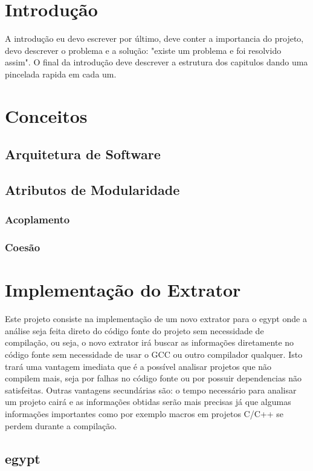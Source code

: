 \chapter{Introdução}

A introdução eu devo escrever por último, deve conter a importancia do projeto,
devo descrever o problema e a solução: "existe um problema e foi resolvido
assim". O final da introdução deve descrever a estrutura dos capitulos dando
uma pincelada rapida em cada um.

\chapter{Conceitos}
\section{Arquitetura de Software}
\section{Atributos de Modularidade}
\subsection{Acoplamento}
\subsection{Coesão}

\chapter{Implementação do Extrator}

Este projeto consiste na implementação de um novo extrator para o egypt onde a
análise seja feita direto do código fonte do projeto sem necessidade de
compilação, ou seja, o novo extrator irá buscar as informações diretamente no
código fonte sem necessidade de usar o GCC ou outro compilador qualquer. Isto
trará uma vantagem imediata que é a possível analisar projetos que
não compilem mais, seja por falhas no código fonte ou por possuir dependencias
não satisfeitas. Outras vantagens secundárias são: o tempo necessário para
analisar um projeto cairá e as informações obtidas serão mais precisas já que
algumas informações importantes como por exemplo macros em projetos C/C++ se
perdem \cite{SourceVersusObjectCodeExtraction} durante a compilação.

\section{egypt}

